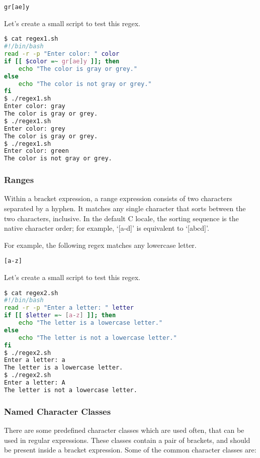 \lstinline|gr[ae]y|

Let's create a small script to test this regex.

\begin{lstlisting}[language=bash]
$ cat regex1.sh
#!/bin/bash
read -r -p "Enter color: " color
if [[ $color =~ gr[ae]y ]]; then
    echo "The color is gray or grey."
else
    echo "The color is not gray or grey."
fi
$ ./regex1.sh
Enter color: gray
The color is gray or grey.
$ ./regex1.sh
Enter color: grey
The color is gray or grey.
$ ./regex1.sh
Enter color: green
The color is not gray or grey.
\end{lstlisting}

\subsubsection{Ranges}

Within a bracket expression, a range expression consists of two characters separated by a hyphen. It matches any single character that sorts between the two characters, inclusive. In the default C locale, the sorting sequence is the native character order; for example, ‘[a-d]’ is equivalent to ‘[abcd]’.

For example, the following regex matches any lowercase letter.

\lstinline|[a-z]|

Let's create a small script to test this regex.

\begin{lstlisting}[language=bash]
$ cat regex2.sh
#!/bin/bash
read -r -p "Enter a letter: " letter
if [[ $letter =~ [a-z] ]]; then
    echo "The letter is a lowercase letter."
else
    echo "The letter is not a lowercase letter."
fi
$ ./regex2.sh
Enter a letter: a
The letter is a lowercase letter.
$ ./regex2.sh
Enter a letter: A
The letter is not a lowercase letter.
\end{lstlisting}

\subsubsection{Named Character Classes}

There are some predefined character classes which are used often, that can be used in regular expressions. These classes contain a pair of brackets, and should be
present inside a bracket expression. Some of the common character classes are:

